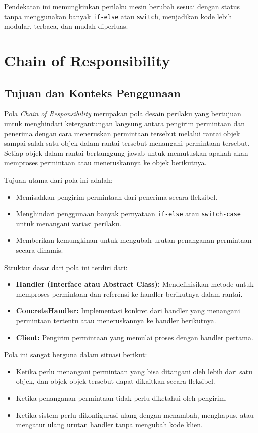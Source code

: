 Pendekatan ini memungkinkan perilaku mesin berubah sesuai dengan status tanpa menggunakan banyak \texttt{if-else} atau \texttt{switch}, menjadikan kode lebih modular, terbaca, dan mudah diperluas.


\section{Chain of Responsibility}
\subsection{Tujuan dan Konteks Penggunaan}

Pola \textit{Chain of Responsibility} merupakan pola desain perilaku yang bertujuan untuk menghindari ketergantungan langsung antara pengirim permintaan dan penerima dengan cara meneruskan permintaan tersebut melalui rantai objek sampai salah satu objek dalam rantai tersebut menangani permintaan tersebut. Setiap objek dalam rantai bertanggung jawab untuk memutuskan apakah akan memproses permintaan atau meneruskannya ke objek berikutnya.

Tujuan utama dari pola ini adalah:
\begin{itemize}
	\item Memisahkan pengirim permintaan dari penerima secara fleksibel.
	\item Menghindari penggunaan banyak pernyataan \texttt{if-else} atau \texttt{switch-case} untuk menangani variasi perilaku.
	\item Memberikan kemungkinan untuk mengubah urutan penanganan permintaan secara dinamis.
\end{itemize}

Struktur dasar dari pola ini terdiri dari:
\begin{itemize}
	\item \textbf{Handler (Interface atau Abstract Class):} Mendefinisikan metode untuk memproses permintaan dan referensi ke handler berikutnya dalam rantai.
	\item \textbf{ConcreteHandler:} Implementasi konkret dari handler yang menangani permintaan tertentu atau meneruskannya ke handler berikutnya.
	\item \textbf{Client:} Pengirim permintaan yang memulai proses dengan handler pertama.
\end{itemize}

Pola ini sangat berguna dalam situasi berikut:
\begin{itemize}
	\item Ketika perlu menangani permintaan yang bisa ditangani oleh lebih dari satu objek, dan objek-objek tersebut dapat dikaitkan secara fleksibel.
	\item Ketika penanganan permintaan tidak perlu diketahui oleh pengirim.
	\item Ketika sistem perlu dikonfigurasi ulang dengan menambah, menghapus, atau mengatur ulang urutan handler tanpa mengubah kode klien.
\end{itemize}

